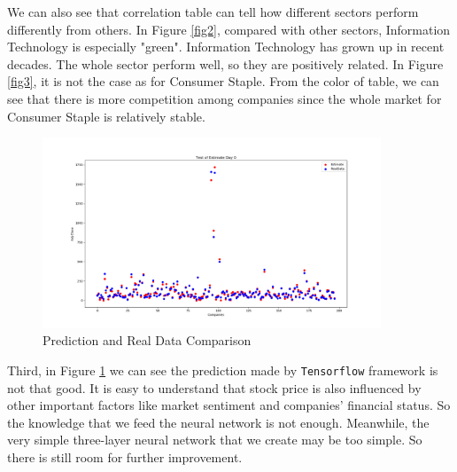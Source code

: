 \documentclass{article}
\begin{document}
    We can also see that correlation table can tell how different sectors perform differently from others. In Figure \ref{fig2}, compared with other sectors, Information Technology is especially "green". Information Technology has grown up in recent decades. The whole sector perform well, so they are positively related. In Figure \ref{fig3}, it is not the case as for Consumer Staple. From the color of table, we can see that there is more competition among companies since the whole market for Consumer Staple is relatively stable.

    \begin{figure}[H]
        \centering
        \includegraphics[width = 0.9\textwidth]{./4.png}
        \caption{Prediction and Real Data Comparison}
        \label{fig4}
    \end{figure}

    Third, in Figure \ref{fig4} we can see the prediction made by \verb!Tensorflow! framework is not that good. It is easy to understand that stock price is also influenced by other important factors like market sentiment and companies' financial status. So the knowledge that we feed the neural network is not enough. Meanwhile, the very simple three-layer neural network that we create may be too simple. So there is still room for further improvement.
\end{document}
